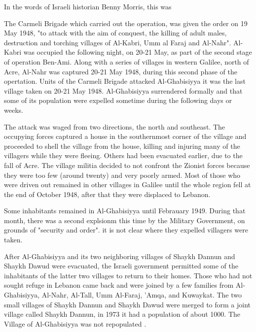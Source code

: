 In the words of Israeli historian Benny Morris, this was \cite[p.252]{Morris2004}

The Carmeli Brigade which carried out the operation, was given the order on 19 May 1948, "to attack with the aim of conquest, the killing of adult males, destruction and torching villages of Al-Kabri, Umm al Faraj and Al-Nahr"\cite[p.253]{Morris2004}. Al-Kabri was occupied the following night, on 20-21 May, as part of the second stage of operation Ben-Ami. Along with a series of villages in western Galilee, north of Acre, Al-Nahr was captured 20-21 May 1948, during this second phase of the opertation. Units of the Carmeli Brigade attacked Al-Ghabisiyya it was the last village taken on 20-21 May 1948. Al-Ghabisiyya surrendered formally and that some of its population were expelled sometime during the following days or weeks\citep{Morris2004}.

The attack was waged from two directions, the north and southeast. The occupying forces captured a house in the southernmost corner of the village and proceeded to shell the village from the house, killing and injuring many of the villagers while they were fleeing. Others had been evacuated earlier, due to the fall of Acre. The village militia decided to not confront the Zionist forces because they were too few (around twenty) and very poorly armed. Most of those who were driven out remained in other villages in Galilee until the whole region fell at the end of October 1948, after that they were displaced to Lebanon\citep{Khalidi2015}.

Some inhabitants remained in Al-Ghabisiyya until Febrauary 1949. During that month, there was a second explsionm this time by the Military Government, on grounds of "security and order". it is not clear where they expelled villagers were taken\citep{Morris2004}.

After Al-Ghabisiyya and its two neighboring villages of Shaykh Dannun and Shaykh Dawud were evacuated, the Israeli government permitted some of the inhabitants of the latter two villages to return to their homes. Those who had not sought refuge in Lebanon came back and were joined by a few families from Al-Ghabisiyya, Al-Nahr, Al-Tall, Umm Al-Faraj, 'Amqa, and Kuwaykat. The two small villages of Shaykh Dannun and Shaykh Dawud were merged to form a joint village called Shaykh Dannun, in 1973 it had a population of about 1000. The Village of Al-Ghabisiyya was not repopulated \cite[p.14-15]{Khalidi2015}.  

